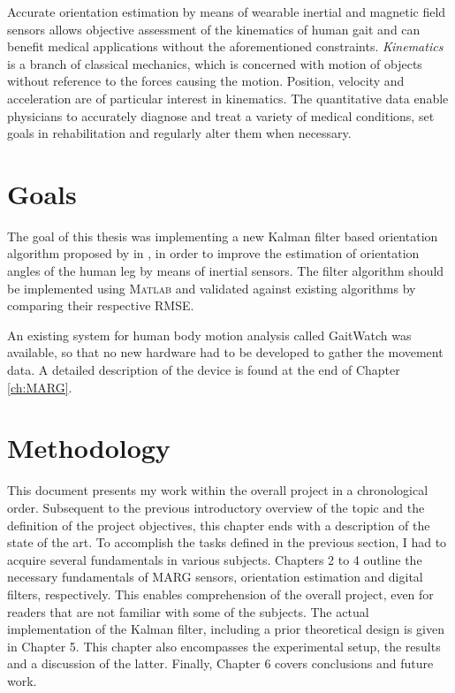 Accurate orientation estimation by means of wearable inertial and magnetic field sensors allows objective assessment of the kinematics of human gait and can benefit medical applications without the aforementioned constraints. \emph{Kinematics} is a branch of classical mechanics, which is concerned with motion of objects without reference to the forces causing the motion. Position, velocity and acceleration are of particular interest in kinematics. The quantitative data enable physicians to accurately diagnose and treat a variety of medical conditions, set goals in rehabilitation and regularly alter them when necessary.

\section{Goals}

The goal of this thesis was implementing a new Kalman filter based orientation algorithm proposed by \citeauthor{bennett_motion_2014} in \cite{bennett_motion_2014}, in order to improve the estimation of orientation angles of the human leg by means of inertial sensors. The filter algorithm should be implemented using \textsc{Matlab}\textsuperscript{\textregistered} and validated against existing algorithms by comparing their respective \gls{RMSE}.

An existing system for human body motion analysis called GaitWatch was available, so that no new hardware had to be developed to gather the movement data. A detailed description of the device is found at the end of Chapter \ref{ch:MARG}. 

\section{Methodology}

This document presents my work within the overall project in a chronological order. Subsequent to the previous introductory overview of the topic and the definition of the project objectives, this chapter ends with a description of the state of the art. To accomplish the tasks defined in the previous section, I had to acquire several fundamentals in various subjects. Chapters 2 to 4 outline the necessary fundamentals of MARG sensors, orientation estimation and digital filters, respectively.  This enables comprehension of the overall project, even for readers that are not familiar with some of the subjects. The actual implementation of the Kalman filter, including a prior theoretical design is given in Chapter 5. This chapter also encompasses the experimental setup, the results and a discussion of the latter. Finally, Chapter 6 covers conclusions and future work.

